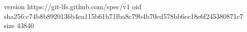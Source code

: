 version https://git-lfs.github.com/spec/v1
oid sha256:c74b8b8920136b4ea115b61b71fba8c79b4b70cd578bb6cc18e6f245380871c7
size 43840
